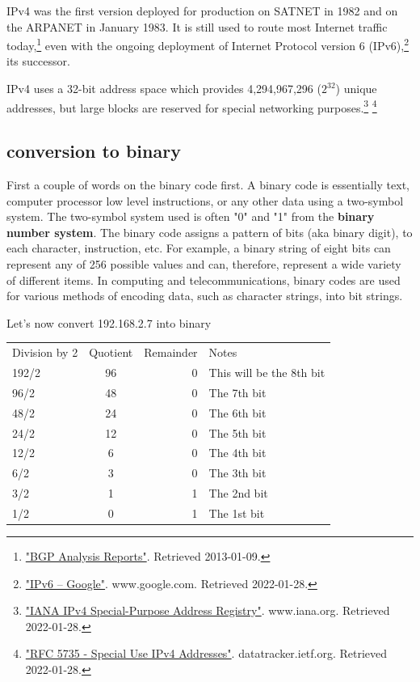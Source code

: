 \documentclass[a4paper,12pt]{article}
\begin{document}
IPv4 was the first version deployed for production on SATNET in 1982 and on the ARPANET in January 1983. It is still used to route most Internet traffic today,\footnote{\label{note2}\href{http://bgp.potaroo.net/index-bgp.html}{"BGP Analysis Reports"}. Retrieved 2013-01-09.} even with the ongoing deployment of Internet Protocol version 6 (IPv6),\footnote{\label{note3}\href{https://www.google.com/intl/en/ipv6/statistics.html}{"IPv6 – Google"}. www.google.com. Retrieved 2022-01-28.} its successor.

IPv4 uses a 32-bit address space which provides 4,294,967,296 ($2^{32}$) unique addresses, but large blocks are reserved for special networking purposes.\footnote{\label{note4}\href{https://www.iana.org/assignments/iana-ipv4-special-registry/iana-ipv4-special-registry.xhtml}{"IANA IPv4 Special-Purpose Address Registry"}. www.iana.org. Retrieved 2022-01-28.} \footnote{\label{note5}\href{https://datatracker.ietf.org/doc/html/rfc5735}{"RFC 5735 - Special Use IPv4 Addresses"}. datatracker.ietf.org. Retrieved 2022-01-28.}




\subsection{conversion to binary}

First a couple of words on the binary code first. A binary code is essentially text, computer processor low level instructions, or any other data using a two-symbol system. The two-symbol system used is often "0" and "1" from the \textbf{binary number system}. The binary code assigns a pattern of bits (aka binary digit), to each character, instruction, etc. For example, a binary string of eight bits can represent any of 256 possible values and can, therefore, represent a wide variety of different items.
In computing and telecommunications, binary codes are used for various methods of encoding data, such as character strings, into bit strings. 

Let's now convert 192.168.2.7 into binary
\newline

\begin{tabular}{||l|c|r|p{5cm}||}
    Division by 2 & Quotient & Remainder & Notes \\
    192/2 & 96 & 0 & This will be the 8th bit \\
    96/2 & 48 & 0 & The 7th bit \\
    48/2 & 24 & 0 & The 6th bit \\
    24/2 & 12 & 0 & The 5th bit \\
    12/2 & 6 & 0 & The 4th bit \\
    6/2 & 3 & 0 & The 3th bit \\
    3/2 & 1 & 1 & The 2nd bit \\
    1/2 & 0 & 1 & The 1st bit \\
\end{tabular}
\end{document}
